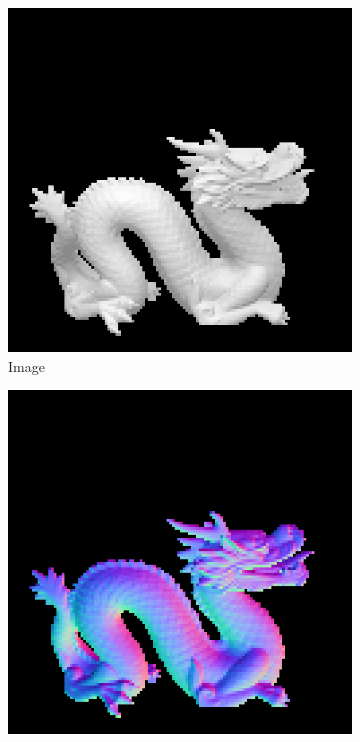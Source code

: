 \begin{figure}[H]
	\centering
	\begin{subfigure}[b]{0.24\linewidth}
		\includegraphics[width=\linewidth]{./Figures/gcnn_synthetic/fancy_eval_7_img.png}
		\caption{Image}
	\end{subfigure}
	\begin{subfigure}[b]{0.24\linewidth}
		\includegraphics[width=\linewidth]{./Figures/gcnn_synthetic/fancy_eval_7_groundtruth.png}

\end{subfigure}
\end{figure}
